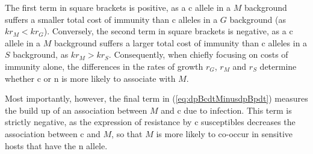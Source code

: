 \documentclass{article}
\newcommand{\badFGE}{M}
\newcommand{\goodFGE}{G}
\newcommand{\sensitive}{\mathrm{n}}
\newcommand{\immune}{\mathrm{c}}
\begin{document}
The first term in square brackets is positive, as a $\immune$ allele in a $\badFGE$ background suffers a smaller total cost of immunity than $\immune$ alleles in a $\goodFGE$ background (as $kr_{\badFGE} < kr_{\goodFGE}$). 
Conversely, the second term in square brackets is negative, as a $\immune$ allele in a $\badFGE$ background suffers a larger total cost of immunity than $\immune$ alleles in a $S$ background, as $kr_{\badFGE}>kr_{S}$. Consequently, when chiefly focusing on costs of immunity alone, the differences in the rates of growth $r_{\goodFGE}$, $r_{\badFGE}$ and $r_{S}$ determine whether $\immune$ or $\sensitive$ is more likely to associate with $\badFGE$.

Most importantly, however, the final term in (\ref{eq:dpBcdtMinusdpBpdt}) measures the build up of an association between $\badFGE$ and $\immune$ due to infection. This term is strictly negative, as the expression of resistance by $\immune$ susceptibles decreases the association between $\immune$ and $\badFGE$, so that $\badFGE$ is more likely to co-occur in sensitive hosts that have the $\sensitive$ allele.
\end{document}

